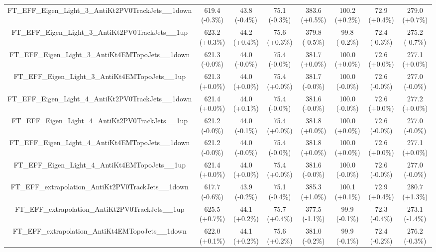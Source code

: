 \begin{table}[htbp!]
\begin{tiny}
\begin{center}
\begin{tabular}{c|c|c|c||c|c|c|c}
FT\_EFF\_Eigen\_Light\_3\_AntiKt2PV0TrackJets\_\_1down       & 619.4     (-0.3\%) & 43.8      (-0.4\%) & 75.1      (-0.3\%) & 383.6     (+0.5\%) & 100.2     (+0.2\%) & 72.9      (+0.4\%) & 279.0     (+0.7\%) \\ 
FT\_EFF\_Eigen\_Light\_3\_AntiKt2PV0TrackJets\_\_1up         & 623.2     (+0.3\%) & 44.2      (+0.4\%) & 75.6      (+0.3\%) & 379.8     (-0.5\%) & 99.8      (-0.2\%) & 72.4      (-0.3\%) & 275.2     (-0.7\%) \\ 
FT\_EFF\_Eigen\_Light\_3\_AntiKt4EMTopoJets\_\_1down         & 621.3     (-0.0\%) & 44.0      (-0.0\%) & 75.4      (-0.0\%) & 381.7     (+0.0\%) & 100.0     (+0.0\%) & 72.6      (+0.0\%) & 277.1     (+0.0\%) \\ 
FT\_EFF\_Eigen\_Light\_3\_AntiKt4EMTopoJets\_\_1up           & 621.3     (+0.0\%) & 44.0      (+0.0\%) & 75.4      (+0.0\%) & 381.7     (-0.0\%) & 100.0     (-0.0\%) & 72.6      (-0.0\%) & 277.0     (-0.0\%) \\ 
FT\_EFF\_Eigen\_Light\_4\_AntiKt2PV0TrackJets\_\_1down       & 621.4     (+0.0\%) & 44.0      (+0.1\%) & 75.4      (-0.0\%) & 381.6     (-0.0\%) & 100.0     (-0.0\%) & 72.6      (+0.0\%) & 277.2     (+0.0\%) \\ 
FT\_EFF\_Eigen\_Light\_4\_AntiKt2PV0TrackJets\_\_1up         & 621.2     (-0.0\%) & 44.0      (-0.1\%) & 75.4      (+0.0\%) & 381.8     (+0.0\%) & 100.0     (+0.0\%) & 72.6      (-0.0\%) & 277.0     (-0.0\%) \\ 
FT\_EFF\_Eigen\_Light\_4\_AntiKt4EMTopoJets\_\_1down         & 621.2     (-0.0\%) & 44.0      (-0.0\%) & 75.4      (-0.0\%) & 381.8     (+0.0\%) & 100.0     (+0.0\%) & 72.6      (+0.0\%) & 277.1     (+0.0\%) \\ 
FT\_EFF\_Eigen\_Light\_4\_AntiKt4EMTopoJets\_\_1up           & 621.4     (+0.0\%) & 44.0      (+0.0\%) & 75.4      (+0.0\%) & 381.6     (-0.0\%) & 100.0     (-0.0\%) & 72.6      (-0.0\%) & 277.0     (-0.0\%) \\ 
FT\_EFF\_extrapolation\_AntiKt2PV0TrackJets\_\_1down         & 617.7     (-0.6\%) & 43.9      (-0.2\%) & 75.1      (-0.4\%) & 385.3     (+1.0\%) & 100.1     (+0.1\%) & 72.9      (+0.4\%) & 280.7     (+1.3\%) \\ 
FT\_EFF\_extrapolation\_AntiKt2PV0TrackJets\_\_1up           & 625.5     (+0.7\%) & 44.1      (+0.2\%) & 75.7      (+0.4\%) & 377.5     (-1.1\%) & 99.9      (-0.1\%) & 72.3      (-0.4\%) & 273.1     (-1.4\%) \\ 
FT\_EFF\_extrapolation\_AntiKt4EMTopoJets\_\_1down           & 622.0     (+0.1\%) & 44.1      (+0.2\%) & 75.6      (+0.2\%) & 381.0     (-0.2\%) & 99.9      (-0.1\%) & 72.4      (-0.2\%) & 276.2     (-0.3\%) \\ 

\end{tabular}
\end{center}
\end{tiny}
\end{table}
